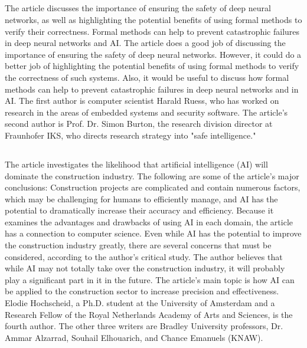 \documentclass[12pt,letterpaper]{article}
\begin{document}
\subsection*{}
The article discusses the importance of ensuring the safety of deep neural networks, as well as highlighting the potential benefits of using formal methods to verify their correctness. Formal methods can help to prevent catastrophic failures in deep neural networks and AI. The article does a good job of discussing the importance of ensuring the safety of deep neural networks. However, it could do a better job of highlighting the potential benefits of using formal methods to verify the correctness of such systems. Also, it would be useful to discuss how formal methods can help to prevent catastrophic failures in deep neural networks and in AI.  The first author is computer scientist Harald Ruess, who has worked on research in the areas of embedded systems and security software. The article's second author is Prof. Dr. Simon Burton, the research division director at Fraunhofer IKS, who directs research strategy into "safe intelligence."


\subsection*{}
The article investigates the likelihood that artificial intelligence (AI) will dominate the construction industry. The following are some of the article's major conclusions: Construction projects are complicated and contain numerous factors, which may be challenging for humans to efficiently manage, and AI has the potential to dramatically increase their accuracy and efficiency. Because it examines the advantages and drawbacks of using AI in each domain, the article has a connection to computer science. Even while AI has the potential to improve the construction industry greatly, there are several concerns that must be considered, according to the author's critical study. The author believes that while AI may not totally take over the construction industry, it will probably play a significant part in it in the future. The article's main topic is how AI can be applied to the construction sector to increase precision and effectiveness. Elodie Hochscheid, a Ph.D. student at the University of Amsterdam and a Research Fellow of the Royal Netherlands Academy of Arts and Sciences, is the fourth author. The other three writers are Bradley University professors, Dr. Ammar Alzarrad, Souhail Elhouarich, and Chance Emanuels (KNAW).
\end{document}

